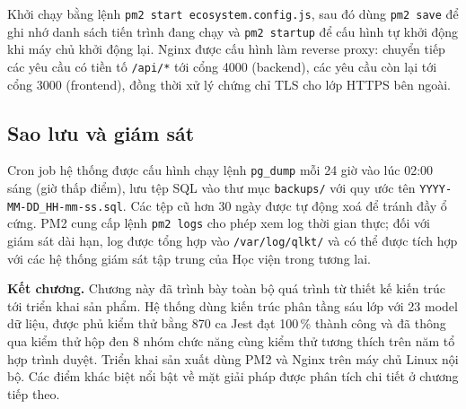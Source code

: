 \documentclass[../DoAn.tex]{subfiles}
\begin{document}
Khởi chạy bằng lệnh \texttt{pm2 start ecosystem.config.js}, sau đó dùng \texttt{pm2 save} để ghi nhớ danh sách tiến trình đang chạy và \texttt{pm2 startup} để cấu hình tự khởi động khi máy chủ khởi động lại. Nginx được cấu hình làm reverse proxy: chuyển tiếp các yêu cầu có tiền tố \texttt{/api/*} tới cổng 4000 (backend), các yêu cầu còn lại tới cổng 3000 (frontend), đồng thời xử lý chứng chỉ TLS cho lớp HTTPS bên ngoài.

\subsection{Sao lưu và giám sát}
\label{subsection:4.5.4}

Cron job hệ thống được cấu hình chạy lệnh \texttt{pg\_dump} mỗi 24 giờ vào lúc 02:00 sáng (giờ thấp điểm), lưu tệp SQL vào thư mục \texttt{backups/} với quy ước tên \texttt{YYYY-MM-DD\_HH-mm-ss.sql}. Các tệp cũ hơn 30 ngày được tự động xoá để tránh đầy ổ cứng. PM2 cung cấp lệnh \texttt{pm2 logs} cho phép xem log thời gian thực; đối với giám sát dài hạn, log được tổng hợp vào \texttt{/var/log/qlkt/} và có thể được tích hợp với các hệ thống giám sát tập trung của Học viện trong tương lai.

\textbf{Kết chương.} Chương này đã trình bày toàn bộ quá trình từ thiết kế kiến trúc tới triển khai sản phẩm. Hệ thống dùng kiến trúc phân tầng sáu lớp với 23 model dữ liệu, được phủ kiểm thử bằng 870 ca Jest đạt 100\,\% thành công và đã thông qua kiểm thử hộp đen 8 nhóm chức năng cùng kiểm thử tương thích trên năm tổ hợp trình duyệt. Triển khai sản xuất dùng PM2 và Nginx trên máy chủ Linux nội bộ. Các điểm khác biệt nổi bật về mặt giải pháp được phân tích chi tiết ở chương tiếp theo.
\end{document}
